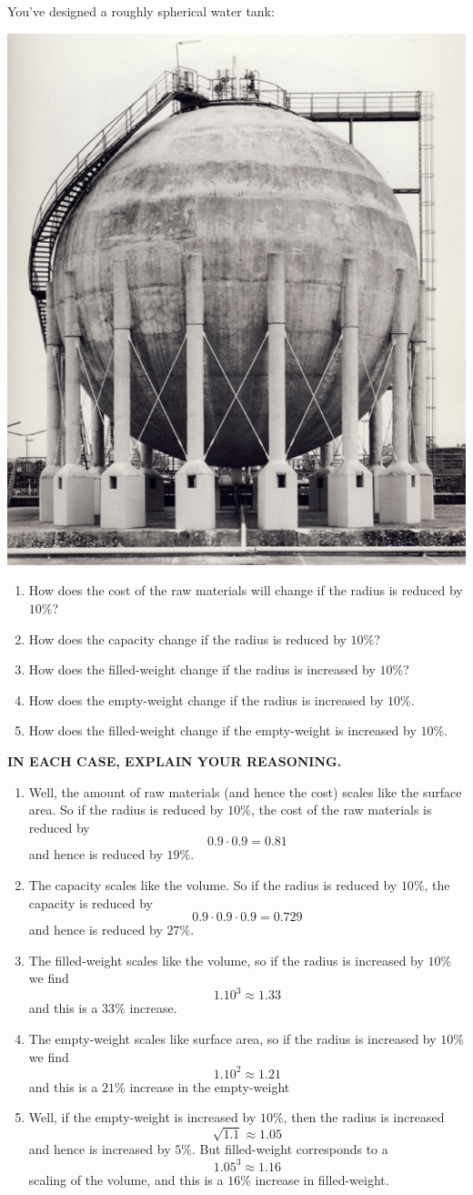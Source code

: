\documentclass[nooutcomes,noauthor,handout]{ximera}
\begin{document}
\begin{question} 
  You've designed a roughly spherical water tank:
\begin{center}%
  \includegraphics[width=.4\textwidth]{tank.png}  
\end{center}
\begin{enumerate}
\item How does the cost of the raw materials will change if the radius
  is reduced by $10\%$?
\item How does the capacity change if the radius is reduced by $10\%$?
\item How does the filled-weight change if the radius is increased by
  $10\%$?
\item How does the empty-weight change if the radius is increased by
  $10\%$.
\item How does the filled-weight change if the empty-weight is
  increased by $10\%$.
\end{enumerate}
\textbf{IN EACH CASE, EXPLAIN YOUR REASONING.}
\begin{freeResponse}
  \begin{enumerate}
  \item Well, the amount of raw materials (and hence the cost) scales
    like the surface area. So if the radius is reduced by $10\%$, the
    cost of the raw materials is reduced by
    \[
    0.9\cdot 0.9 = 0.81
    \]
    and hence is reduced by $19\%$.
  \item The capacity scales like the volume.  So if the radius is
    reduced by $10\%$, the capacity is reduced by
    \[
    0.9\cdot 0.9\cdot 0.9 = 0.729
    \]
    and hence is reduced by $27\%$.
  \item The filled-weight scales like the volume, so if the radius is
    increased by $10\%$ we find
    \[
    1.10^3 \approx 1.33
    \]
    and this is a $33\%$ increase.
  \item The empty-weight scales like surface area, so if the radius is
    increased by $10\%$ we find
    \[
    1.10^2 \approx 1.21
    \]
    and this is a $21\%$ increase in the empty-weight
  \item Well, if the empty-weight is increased by $10\%$, then the
    radius is increased
    \[
    \sqrt{1.1} \approx 1.05
    \]
    and hence is increased by $5\%$. But filled-weight corresponds to
    a
    \[
    1.05^3 \approx 1.16
    \]
    scaling of the volume, and this is a $16\%$ increase in filled-weight.
  \end{enumerate}
\end{freeResponse}

\end{question}
\end{document}
